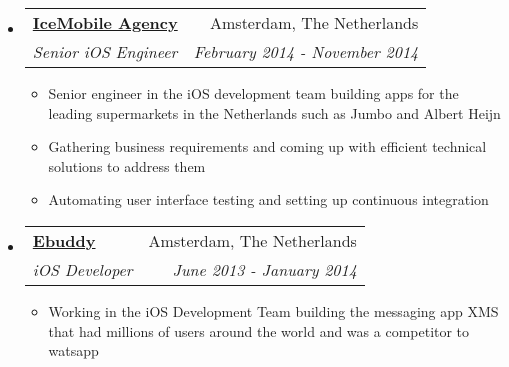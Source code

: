 \documentclass[letterpaper,11pt]{article}
\makeatletter
\newcommand{\resitem}[1]{\item #1 \vspace{-2pt}}
\newcommand{\ressubheading}[4]{
\begin{tabular*}{7.0in}{l@{\extracolsep{\fill}}r}
    \textbf{#1} & #2 \\
    \textit{#3} & \textit{#4} \\
\end{tabular*}\vspace{-6pt}}
\makeatother
\begin{document}
\begin{itemize}
\item
    \ressubheading{\href{http://www.icemobile.com}{IceMobile Agency}}{Amsterdam, The Netherlands}{Senior iOS Engineer}{February 2014 - November 2014}
    \begin{itemize}
        \resitem{Senior engineer in the iOS development team building apps for the leading supermarkets in the Netherlands such as Jumbo and Albert Heijn}
        \resitem{Gathering business requirements and coming up with efficient technical solutions to address them}
        \resitem{Automating user interface testing and setting up continuous integration}
    \end{itemize}

\item
    \ressubheading{\href{http://www.ebuddy.com}{Ebuddy}}{Amsterdam, The Netherlands}{iOS Developer}{June 2013 - January 2014}
    \begin{itemize}
        \resitem{Working in the iOS Development Team building the messaging app XMS that had millions of users around the world and was a competitor to watsapp}
    \end{itemize}

\end{itemize}

\vspace{0.3in}
\end{document}
